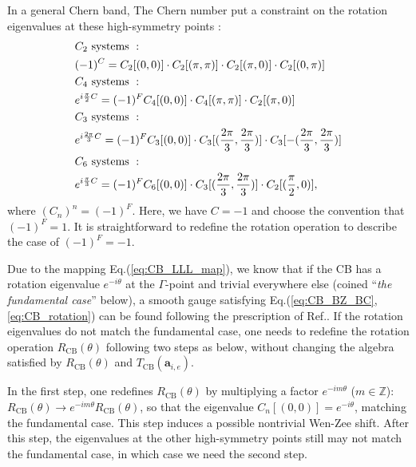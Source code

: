 \begin{subappendices}
In a general Chern band, The Chern number put a constraint on the rotation eigenvalues at these high-symmetry points \cite{fang2012bulk}:
\begin{align}
&C_2 \text{ systems }:\notag\\
& (-1)^C=C_2[(0,0)]\cdot C_2[(\pi,\pi)]\cdot C_2[(\pi,0)]\cdot C_2[(0,\pi)]\notag\\
&C_4 \text{ systems }:\notag\\
& e^{i\frac{\pi}{2}C}=(-1)^F C_4[(0,0)]\cdot C_4[(\pi,\pi)]\cdot C_2[(\pi,0)]\notag\\
&C_3 \text{ systems }:\notag\\
& e^{i\frac{2\pi}{3}C}=(-1)^F C_3[(0,0)]\cdot C_3[(\frac{2\pi}{3},\frac{2\pi}{3})]\cdot C_3[-(\frac{2\pi}{3},\frac{2\pi}{3})]\notag\\
&C_6 \text{ systems }:\notag\\
&e^{i\frac{\pi}{3}C}=(-1)^F C_6[(0,0)]\cdot C_3[(\frac{2\pi}{3},\frac{2\pi}{3})]\cdot C_2[(\frac{\pi}{2},0)],\label{eq:C_constraint}
\end{align}
where $(C_n)^n=(-1)^F$. Here, we have $C=-1$ and choose the convention that $(-1)^F=1$. It is straightforward to redefine the rotation operation to describe the case of $(-1)^F=-1$. 

Due to the mapping Eq.(\ref{eq:CB_LLL_map}), we know that if the CB has a rotation eigenvalue $e^{-i\theta}$ at the $\Gamma$-point and trivial everywhere else (coined ``\emph{the fundamental case}'' below), a smooth gauge satisfying Eq.(\ref{eq:CB_BZ_BC},\ref{eq:CB_rotation}) can be found following the prescription of Ref.\cite{jian2013crystal}. If the rotation eigenvalues do not match the fundamental case, one needs to redefine the rotation operation $R_{\text{CB}}(\theta)$ following two steps as below, without changing the algebra satisfied by $R_{\text{CB}}(\theta)$ and $T_{\text{CB}}(\mathbf a_{i,e})$.

In the first step, one redefines $R_{\text{CB}}(\theta)$ by multiplying a factor $e^{-im\theta}$ ($m\in\mathbb Z$): $R_{\text{CB}}(\theta)\rightarrow e^{-im\theta}R_{\text{CB}}(\theta)$, so that the eigenvalue $C_n[(0,0)]=e^{-i\theta}$, matching the fundamental case. This step induces a possible nontrivial Wen-Zee shift. After this step, the eigenvalues at the other high-symmetry points still may not match the fundamental case, in which case we need the second step. 


\end{subappendices}

